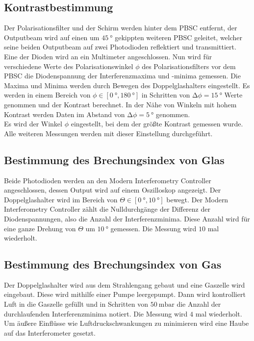 \subsection{Kontrastbestimmung}

\noindent Der Polarisationsfilter und der Schirm werden hinter dem PBSC entfernt, der Outputbeam wird auf einen um $\SI{45}{\degree}$ gekippten weiteren PBSC geleitet, welcher seine beiden
Outputbeam auf zwei Photodioden reflektiert und transmittiert. Eine der Dioden wird an ein Multimeter angeschlossen. Nun wird für verschiedene Werte des Polarisationswinkel $\phi$ des 
Polarisationsfilters vor dem PBSC die Diodenspannung der Interferenzmaxima und -minima gemessen. Die Maxima und Minima werden durch Bewegen des Doppelglashalters eingestellt. Es werden 
in einem Bereich von $\phi \in \left[ \SI{0}{\degree}, \SI{180}{\degree}\right]$ in Schritten von $\increment \phi = \SI{15}{\degree}$ Werte genommen und der Kontrast berechnet. In der Nähe von Winkeln 
mit hohem Kontrast werden Daten im Abstand von $\increment\phi = \SI{5}{\degree}$ genommen.\\
Es wird der Winkel $\phi$ eingestellt, bei dem der größte Kontrast gemessen wurde. Alle weiteren Messungen werden mit dieser Einstellung durchgeführt.


\subsection{Bestimmung des Brechungsindex von Glas}

\noindent Beide Photodioden werden an den Modern Interferometry Controller angeschlossen, dessen Output wird auf einem Oszilloskop angezeigt. Der Doppelglashalter wird im Bereich von 
$\Theta \in \left[ \SI{0}{\degree}, \SI{10}{\degree}\right]$ bewegt. Der Modern  Interferometry Controller zählt die Nulldurchgänge der Differenz der Diodenspannungen, also die Anzahl 
der Interferenzminima. Diese Anzahl wird für eine ganze Drehung von $\Theta$ um $\SI{10}{\degree}$ gemessen. Die Messung wird $\num{10}$ mal wiederholt.


\subsection{Bestimmung des Brechungsindex von Gas}

\noindent Der Doppelglashalter wird aus dem Strahlengang gebaut und eine Gaszelle wird eingebaut. Diese wird mithilfe einer Pumpe leergepumpt. Dann wird kontrolliert Luft in die Gaszelle 
gefüllt und in Schritten von $\SI{50}{\milli\bar}$ die Anzahl der durchlaufenden Interferenzminima notiert. Die Messung wird $\num{4}$ mal wiederholt. Um äußere Einflüsse wie 
Luftdruckschwankungen zu minimieren wird eine Haube auf das Interferometer gesetzt. 